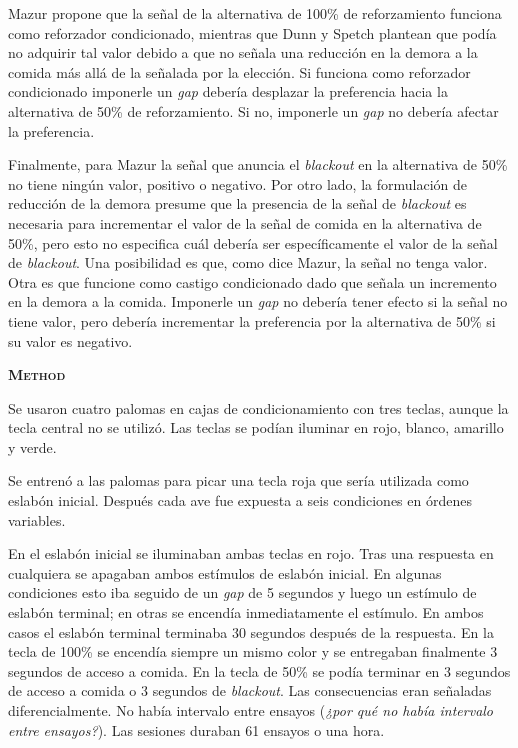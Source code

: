 \documentclass[a4paper,12pt]{article}
\begin{document}
Mazur propone que la señal de la alternativa de 100\% de reforzamiento funciona como reforzador condicionado, mientras que Dunn y Spetch plantean que podía no adquirir tal valor debido a que no señala una reducción en la demora a la comida más allá de la señalada por la elección. Si funciona como reforzador condicionado imponerle un {\itshape gap} debería desplazar la preferencia hacia la alternativa de 50\% de reforzamiento. Si no, imponerle un {\itshape gap} no debería afectar la preferencia.

Finalmente, para Mazur la señal que anuncia el {\itshape blackout} en la alternativa de 50\% no tiene ningún valor, positivo o negativo. Por otro lado, la formulación de reducción de la demora presume que la presencia de la señal de {\itshape blackout} es necesaria para incrementar el valor de la señal de comida en la alternativa de 50\%, pero esto no especifica cuál debería ser específicamente el valor de la señal de {\itshape blackout}. Una posibilidad es que, como dice Mazur, la señal no tenga valor. Otra es que funcione como castigo condicionado dado que señala un incremento en la demora a la comida. Imponerle un {\itshape gap} no debería tener efecto si la señal no tiene valor, pero debería incrementar la preferencia por la alternativa de 50\% si su valor es negativo.

{\scshape\bfseries Method}

Se usaron cuatro palomas en cajas de condicionamiento con tres teclas, aunque la tecla central no se utilizó. Las teclas se podían iluminar en rojo, blanco, amarillo y verde. 

Se entrenó a las palomas para picar una tecla roja que sería utilizada como eslabón inicial. Después cada ave fue expuesta a seis condiciones en órdenes variables. 

En el eslabón inicial se iluminaban ambas teclas en rojo. Tras una respuesta en cualquiera se apagaban ambos estímulos de eslabón inicial. En algunas condiciones esto iba seguido de un {\itshape gap} de 5 segundos y luego un estímulo de eslabón terminal; en otras se encendía inmediatamente el estímulo. En ambos casos el eslabón terminal terminaba 30 segundos después de la respuesta. En la tecla de 100\% se encendía siempre un mismo color y se entregaban finalmente 3 segundos de acceso a comida. En la tecla de 50\% se podía terminar en 3 segundos de acceso a comida o 3 segundos de {\itshape blackout}. Las consecuencias eran señaladas diferencialmente. No había intervalo entre ensayos ({\itshape ¿por qué no había intervalo entre ensayos?}). Las sesiones duraban 61 ensayos o una hora.
\end{document}
